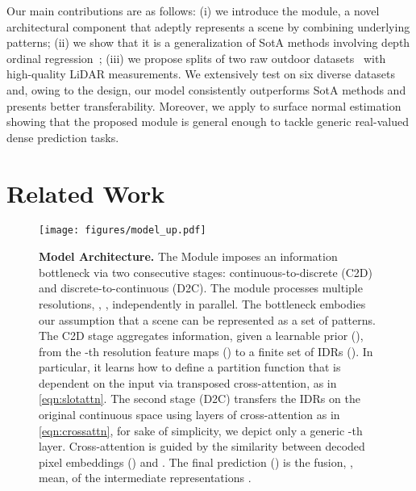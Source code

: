 Our main contributions are as follows: (i) we introduce the \ourmodulename module, a novel architectural component that adeptly represents a scene by combining underlying patterns; (ii) we show that it is a generalization of SotA methods involving depth ordinal regression~\cite{Fu2018, Bhat2020}; (iii) we propose splits of two raw outdoor datasets~\cite{Chang2019, Guizilini2020} with high-quality LiDAR measurements. We extensively test \ourmodel on six diverse datasets and, owing to the \ourmodule design, our model consistently outperforms SotA methods and presents better transferability. Moreover, we apply \ourmodel to surface normal estimation showing that the proposed module is general enough to tackle generic real-valued dense prediction tasks.

\section{Related Work}
\label{sec:relwork}

\begin{figure*}[t]
    \centering
    \texttt{[image: figures/model\_up.pdf]}
    \vspace{-15pt}
    \caption{\textbf{Model Architecture.} The \ourmodulename Module imposes an information bottleneck via two consecutive stages: continuous-to-discrete (C2D) and discrete-to-continuous (D2C). The module processes multiple resolutions, \ie, , independently in parallel. The bottleneck embodies our assumption that a scene can be represented as a set of patterns. The C2D stage aggregates information, given a learnable prior (), from the -th resolution feature maps () to a finite set of IDRs (). In particular, it learns how to define a partition function that is dependent on the input  via transposed cross-attention, as in \eqref{eqn:slotattn}. The second stage (D2C) transfers the IDRs on the original continuous space using layers of cross-attention as in \eqref{eqn:crossattn}, for sake of simplicity, we depict only a generic -th layer. Cross-attention is guided by the similarity between decoded pixel embeddings () and . The final prediction () is the fusion, \ie, mean, of the intermediate representations .}
    \label{fig:model}
    \vspace{-15pt}
\end{figure*}

